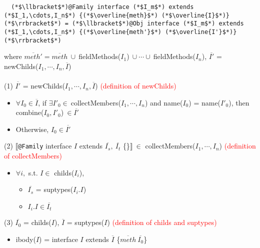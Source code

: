 \begin{figure*}
\begin{lstlisting}
  (*$\llbracket$*)@Family interface (*$I_m$*) extends (*$I_1,\cdots,I_n$*) {(*$\overline{meth}$*) (*$\overline{I}$*)}(*$\rrbracket$*) = (*$\llbracket$*)@Obj interface (*$I_m$*) extends (*$I_1,\cdots,I_n$*) {(*$\overline{meth'}$*) (*$\overline{I'}$*)}(*$\rrbracket$*)
\end{lstlisting}
\hspace{.3in}where $\overline{meth'}=\overline{meth}\ \cup\ $\textsf{fieldMethods(}$I_1$\textsf{)}$\ \cup\cdots\cup\ $\textsf{fieldMethods(}$I_n$\textsf{)}, $\overline{I'}$ = \textsf{newChilds(}$I_1,\cdots,I_n,\overline{I}$\textsf{)}
~\\~\\
(1) $\overline{I'}$ = \textsf{newChilds(}$I_1,\cdots,I_n,\overline{I}$\textsf{)} \textcolor{red}{(definition of newChilds)}
    \begin{itemize}
    \item $\forall I_0\in\overline{I}$, if $\exists I'_0\in\ $\textsf{collectMembers(}$I_1,\cdots,I_n$\textsf{)} and \textsf{name(}$I_0$\textsf{)} = \textsf{name(}$I'_0$\textsf{)}, then \textsf{combine(}$I_0,I'_0$\textsf{)}$\ \in\overline{I'}$
    \item Otherwise, $I_0\in\overline{I'}$
    \end{itemize}
(2) $\llbracket$\lstinline{@Family}\textsf{ interface }$I$\textsf{ extends }$\overline{I_s},\ \overline{I_t}$\textsf{ \{\}}$\rrbracket\ \in$ \textsf{collectMembers(}$I_1,\cdots,I_n$\textsf{)} \textcolor{red}{(definition of collectMembers)}
    \begin{itemize}
    \item $\forall i,$ s.t. $I\in$\textsf{ childs(}$I_i$\textsf{)},
        \begin{itemize}
        \item $\overline{I_s}$ = \textsf{suptypes(}$I_i.I$\textsf{)}
        \item $I_i.I\in\overline{I_t}$
        \end{itemize}
    \end{itemize}
(3) $\overline{I_0}$ = \textsf{childs(}$I$\textsf{)}, $\overline{I}$ = \textsf{suptypes(}$I$\textsf{)} \textcolor{red}{(definition of childs and suptypes)}
    \begin{itemize}
    \item \textsf{ibody(}$I$\textsf{)} = \textsf{interface }$I$\textsf{ extends }$\overline{I}$\textsf{ \{}$\overline{meth}\ \overline{I_0}$\textsf{\}}
    \end{itemize}

\end{figure*}
